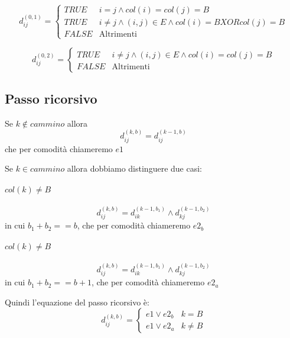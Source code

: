 \documentclass[12pt, a4paper, openany]{book}
\begin{document}
\begin{equation*}
	d_{ij}^{(0,1)} = \begin{cases}
		TRUE  & i=j\land col(i)= col(j) = B                          \\
		TRUE  & i\neq j\land (i,j)\in E \land col(i)= B XOR col(j)=B \\
		FALSE & \text{Altrimenti}
	\end{cases}
\end{equation*}

\begin{equation*}
	d_{ij}^{(0,2)} = \begin{cases}
		TRUE  & i\neq j\land (i,j)\in E \land col(i)= col(j)= B \\
		FALSE & \text{Altrimenti}
	\end{cases}
\end{equation*}

\subsection*{Passo ricorsivo}
Se $k \notin cammino$ allora
\begin{equation*}
	d_{ij}^{(k,b)} = d_{ij}^{(k-1,b)}
\end{equation*}
che per comodità chiameremo $e1$

Se $k \in cammino$ allora dobbiamo distinguere due casi:
\paragraph{$col(k) \neq B$}
\begin{equation*}
	d_{ij}^{(k,b)} = d_{ik}^{(k-1,b_1)} \land d_{kj}^{(k-1,b_2)}
\end{equation*}
in cui $b_1 + b_2 == b$, che per comodità chiameremo $e2_b$
\paragraph{$col(k) \neq B$}
\begin{equation*}
	d_{ij}^{(k,b)} = d_{ik}^{(k-1,b_1)} \land d_{kj}^{(k-1,b_2)}
\end{equation*}
in cui $b_1 + b_2 == b+1$, che per comodità chiameremo $e2_a$

Quindi l'equazione del passo ricorsivo è:
\begin{equation*}
	d^{(k,b)}_{ij} = \begin{cases}
		e1 \lor e2_b & k=B     \\
		e1 \lor e2_a & k\neq B
	\end{cases}
\end{equation*}
\end{document}
